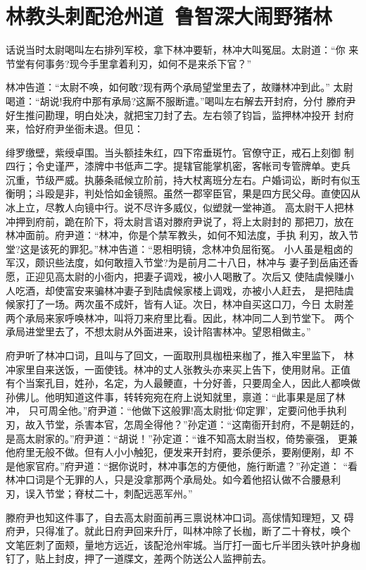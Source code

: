 \chapter{林教头刺配沧州道~鲁智深大闹野猪林}

话说当时太尉喝叫左右排列军校，拿下林冲要斩，林冲大叫冤屈。太尉道：“你
来节堂有何事务?现今手里拿着利刃，如何不是来杀下官？”

林冲告道：“太尉不唤，如何敢?现有两个承局望堂里去了，故赚林冲到此。”
太尉喝道：“胡说!我府中那有承局?这厮不服断遣。”喝叫左右解去开封府，分付
滕府尹好生推问勘理，明白处决，就把宝刀封了去。左右领了钧旨，监押林冲投开
封府来，恰好府尹坐衙未退。但见：

绯罗缴壁，紫绶卓围。当头额挂朱红，四下帘垂斑竹。官僚守正，戒石上刻御
制四行；令史谨严，漆牌中书低声二字。提辖官能掌机密，客帐司专管牌单。吏兵
沉重，节级严威。执藤条祗候立阶前，持大杖离班分左右。户婚词讼，断时有似玉
衡明；斗殴是非，判处恰如金镜照。虽然一郡宰臣官，果是四方民父母。直使囚从
冰上立，尽教人向镜中行。说不尽许多威仪，似塑就一堂神道。
高太尉干人把林冲押到府前，跪在阶下，将太尉言语对滕府尹说了，将上太尉封的
那把刀，放在林冲面前。府尹道：“林冲，你是个禁军教头，如何不知法度，手执
利刃，故入节堂?这是该死的罪犯。”林冲告道：“恩相明镜，念林冲负屈衔冤。
小人虽是粗卤的军汉，颇识些法度，如何敢擅入节堂?为是前月二十八日，林冲与
妻子到岳庙还香愿，正迎见高太尉的小衙内，把妻子调戏，被小人喝散了。次后又
使陆虞候赚小人吃酒，却使富安来骗林冲妻子到陆虞候家楼上调戏，亦被小人赶去，
是把陆虞候家打了一场。两次虽不成奸，皆有人证。次日，林冲自买这口刀，今日
太尉差两个承局来家呼唤林冲，叫将刀来府里比看。因此，林冲同二人到节堂下。
两个承局进堂里去了，不想太尉从外面进来，设计陷害林冲。望恩相做主。”

府尹听了林冲口词，且叫与了回文，一面取刑具枷杻来枷了，推入牢里监下，
林冲家里自来送饭，一面使钱。林冲的丈人张教头亦来买上告下，使用财帛。正值
有个当案孔目，姓孙，名定，为人最鲠直，十分好善，只要周全人，因此人都唤做
孙佛儿。他明知道这件事，转转宛宛在府上说知就里，禀道：“此事果是屈了林冲，
只可周全他。”府尹道：“他做下这般罪!高太尉批‘仰定罪’，定要问他手执利
刃，故入节堂，杀害本官，怎周全得他？”孙定道：“这南衙开封府，不是朝廷的，
是高太尉家的。”府尹道：“胡说！”孙定道：“谁不知高太尉当权，倚势豪强，
更兼他府里无般不做。但有人小小触犯，便发来开封府，要杀便杀，要剐便剐，却
不是他家官府。”府尹道：“据你说时，林冲事怎的方便他，施行断遣？”孙定道：
“看林冲口词是个无罪的人，只是没拿那两个承局处。如今着他招认做不合腰悬利
刃，误入节堂；脊杖二十，刺配远恶军州。”

滕府尹也知这件事了，自去高太尉面前再三禀说林冲口词。高俅情知理短，又
碍府尹，只得准了。就此日府尹回来升厅，叫林冲除了长枷，断了二十脊杖，唤个
文笔匠刺了面颊，量地方远近，该配沧州牢城。当厅打一面七斤半团头铁叶护身枷
钉了，贴上封皮，押了一道牒文，差两个防送公人监押前去。

